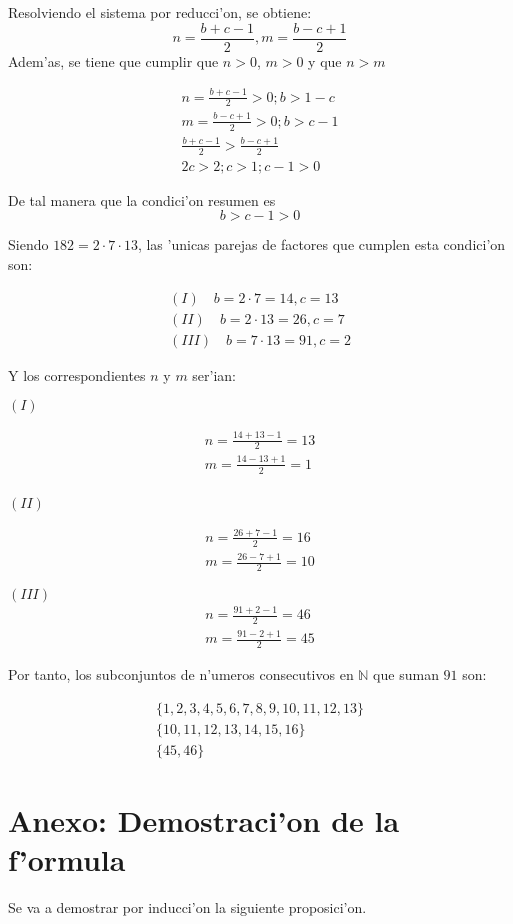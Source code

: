 \documentclass[12pt]{article}
\begin{document}
Resolviendo el sistema por reducci'on, se obtiene:
$$
   n = \frac{b+c-1}{2}, m = \frac{b-c+1}{2}
$$
Adem'as, se tiene que cumplir que $n > 0$, $m > 0$ y que $n > m$

\begin{align*}
n = \frac{b+c-1}{2} > 0; b > 1-c \\
m = \frac{b-c+1}{2} > 0; b > c -1 \\
\frac{b+c-1}{2} > \frac{b-c+1}{2} \\
2c > 2; c > 1; c - 1 > 0
\end{align*}

De tal manera que la condici'on resumen es
$$
b > c -1 > 0
$$

Siendo $182 = 2\cdot7\cdot13$,  las 'unicas parejas de factores que cumplen esta condici'on son:

\begin{align*}
(I)  \quad b= 2\cdot7 = 14, c = 13 \\
(II) \quad b = 2\cdot13 = 26, c = 7 \\
(III)\quad b = 7\cdot13 = 91, c= 2
\end{align*}


Y los correspondientes $n$ y $m$ ser'ian:


$(I)$

\begin{align*}
n=\frac{14+13-1}{2}=13\\
m = \frac{14-13+1}{2} = 1\\
\end{align*}


$(II)$

\begin{align*}
n = \frac{26+7-1}{2} = 16\\
m = \frac{26-7+1}{2} = 10
\end{align*}


$(III)$
\begin{align*}
n = \frac{91+2-1}{2} = 46\\
m = \frac{91-2+1}{2} = 45
\end{align*}

Por tanto, los subconjuntos de n'umeros consecutivos en $\mathbb{N}$ que suman $91$ son:

\begin{align*}
\{1,2,3,4,5,6,7,8,9,10,11,12,13\}\\
\{10, 11, 12, 13, 14, 15,16\}\\
\{45, 46\}
\end{align*}

\section{Anexo: Demostraci'on de la f'ormula}
Se va a demostrar por inducci'on la siguiente proposici'on.
\end{document}
